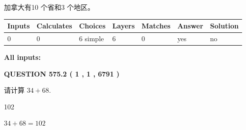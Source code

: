 \documentclass{ctexart}
\begin{document}
 
加拿大有10 个省和3 个地区。
 
 
\noindent{}
 
 
   
   
   
   
\noindent\begin{tabular}{|l|l|l|l|l|l|l|}
 \hline
Inputs & Calculates & Choices & Layers & Matches & Answer & Solution \\ \hline
 0  & 
 0  & 
 6
  simple  
  & 
 6  & 
 0  & 
  yes & 
  no 
  \\ \hline
 \end{tabular}
   
   
   
   
\noindent{}
   
   
   
   
\noindent\vspace{0.1in}\hspace{-0.08in} {\textbf{\Large{All inputs: }}}
   
   
  
\vspace{0.2in}
  
{\textbf{\Large{QUESTION
575.2 
 ( 1 , 1 , 6791 )
}}}
  
  
 
请计算 $ %
34 +  %
68 $.
 
 
 
\noindent{}
 
 

102
 
 
\noindent{}
 
 

 
 
 
\noindent{}
 
 

$ %
34 +  %
68=   %
102$
 
 
\noindent{}
 
 

 
   
   
   
\end{document}
